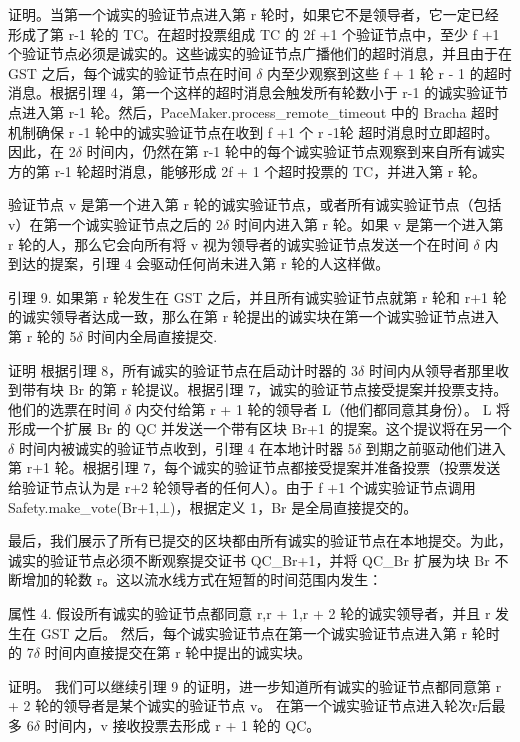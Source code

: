 证明。当第一个诚实的验证节点进入第 r 轮时，如果它不是领导者，它一定已经形成了第 r-1 轮的 TC。在超时投票组成 TC 的 2f +1 个验证节点中，至少 f +1 个验证节点必须是诚实的。这些诚实的验证节点广播他们的超时消息，并且由于在 GST 之后，每个诚实的验证节点在时间 $\delta$ 内至少观察到这些 f + 1 轮 r - 1 的超时消息。根据引理 4，第一个这样的超时消息会触发所有轮数小于 r-1 的诚实验证节点进入第 r-1 轮。然后，PaceMaker.process\_remote\_timeout 中的 Bracha 超时机制确保 r -1 轮中的诚实验证节点在收到 f +1 个 r -1轮  超时消息时立即超时。因此，在 2$\delta$ 时间内，仍然在第 r-1 轮中的每个诚实验证节点观察到来自所有诚实方的第 r-1 轮超时消息，能够形成 2f + 1 个超时投票的 TC，并进入第 r 轮。

验证节点 v 是第一个进入第 r 轮的诚实验证节点，或者所有诚实验证节点（包括 v）在第一个诚实验证节点之后的 2$\delta$ 时间内进入第 r 轮。如果 v 是第一个进入第 r 轮的人，那么它会向所有将 v 视为领导者的诚实验证节点发送一个在时间 $\delta$ 内到达的提案，引理 4 会驱动任何尚未进入第 r 轮的人这样做。

引理 9. 如果第 r 轮发生在 GST 之后，并且所有诚实验证节点就第 r 轮和 r+1 轮的诚实领导者达成一致，那么在第 r 轮提出的诚实块在第一个诚实验证节点进入第 r 轮的 5$\delta$ 时间内全局直接提交.

证明 根据引理 8，所有诚实的验证节点在启动计时器的 3$\delta$ 时间内从领导者那里收到带有块 Br 的第 r 轮提议。根据引理 7，诚实的验证节点接受提案并投票支持。他们的选票在时间 $\delta$ 内交付给第 r + 1 轮的领导者 L（他们都同意其身份）。 L 将形成一个扩展 Br 的 QC 并发送一个带有区块 Br+1 的提案。这个提议将在另一个 $\delta$ 时间内被诚实的验证节点收到，引理 4 在本地计时器 5$\delta$ 到期之前驱动他们进入第 r+1 轮。根据引理 7，每个诚实的验证节点都接受提案并准备投票（投票发送给验证节点认为是 r+2 轮领导者的任何人）。由于 f +1 个诚实验证节点调用 Safety.make\_vote(Br+1,$\bot$)，根据定义 1，Br 是全局直接提交的。

最后，我们展示了所有已提交的区块都由所有诚实的验证节点在本地提交。为此，诚实的验证节点必须不断观察提交证书 QC\_Br+1，并将 QC\_Br 扩展为块 Br 不断增加的轮数 r。这以流水线方式在短暂的时间范围内发生：

属性 4. 假设所有诚实的验证节点都同意 r,r + 1,r + 2 轮的诚实领导者，并且 r 发生在 GST 之后。 然后，每个诚实验证节点在第一个诚实验证节点进入第 r 轮时的 7$\delta$ 时间内直接提交在第 r 轮中提出的诚实块。

证明。 我们可以继续引理 9 的证明，进一步知道所有诚实的验证节点都同意第 r + 2 轮的领导者是某个诚实的验证节点 v。 在第一个诚实验证节点进入轮次r后最多 6$\delta$ 时间内，v 接收投票去形成 r + 1 轮的 QC。

